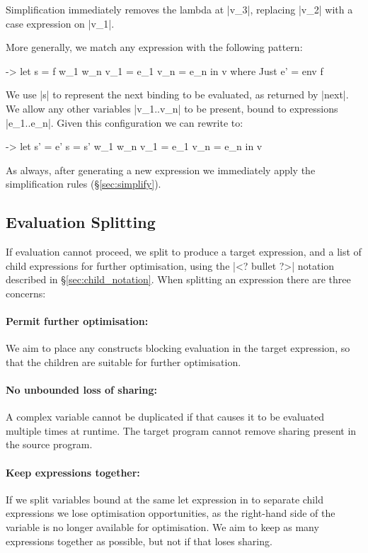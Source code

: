 \documentclass[draft]{sigplanconf}
\begin{document}
Simplification immediately removes the lambda at |v_3|, replacing |v_2| with a case expression on |v_1|.

More generally, we match any expression with the following pattern:

\begin{code}
\free ->  let  s    = f w_1 w_n
               v_1  = e_1
               v_n  = e_n
          in   v
where Just e' = env f
\end{code}

We use |s| to represent the next binding to be evaluated, as returned by |next|. We allow any other variables |v_1..v_n| to be present, bound to expressions |e_1..e_n|. Given this configuration we can rewrite to:

\begin{code}
\free ->  let  s'   = e'
               s    = s' w_1 w_n
               v_1  = e_1
               v_n  = e_n
          in   v
\end{code}

As always, after generating a new expression we immediately apply the simplification rules (\S\ref{sec:simplify}).

\subsection{Evaluation Splitting}
\label{sec:eval_split}

If evaluation cannot proceed, we split to produce a target expression, and a list of child expressions for further optimisation, using the |<? bullet ?>| notation described in \S\ref{sec:child_notation}. When splitting an expression there are three concerns:

\paragraph{Permit further optimisation:} We aim to place any constructs blocking evaluation in the target expression, so that the children are suitable for further optimisation.

\paragraph{No unbounded loss of sharing:} A complex variable cannot be duplicated if that causes it to be evaluated multiple times at runtime. The target program cannot remove sharing present in the source program.

\paragraph{Keep expressions together:} If we split variables bound at the same let expression in to separate child expressions we lose optimisation opportunities, as the right-hand side of the variable is no longer available for optimisation. We aim to keep as many expressions together as possible, but not if that loses sharing.
\end{document}
